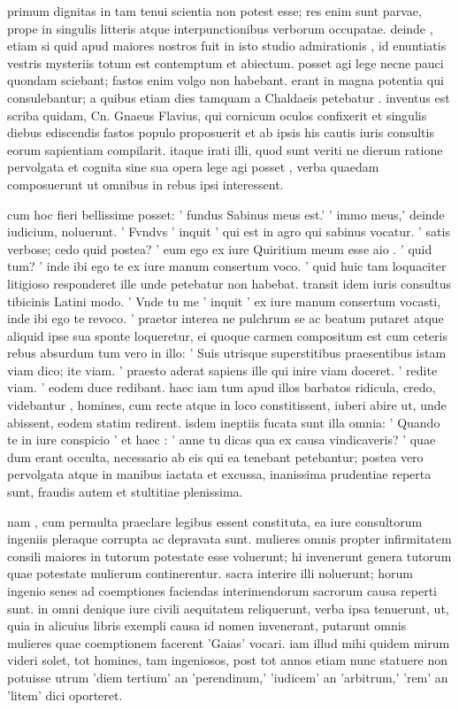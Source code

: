  primum dignitas in tam tenui scientia non potest esse; res enim sunt parvae, prope in singulis litteris atque interpunctionibus verborum occupatae. deinde , etiam si quid apud maiores nostros fuit in isto studio admirationis , id enuntiatis vestris mysteriis totum est contemptum et abiectum. posset agi lege necne pauci quondam sciebant; fastos enim volgo non habebant. erant in magna potentia qui consulebantur; a quibus etiam dies tamquam a Chaldaeis petebatur . inventus est scriba quidam, Cn. Gnaeus Flavius, qui cornicum oculos confixerit et singulis diebus ediscendis fastos populo proposuerit et ab ipsis his cautis iuris consultis eorum sapientiam compilarit. itaque irati illi, quod sunt veriti ne dierum ratione pervolgata et cognita sine sua opera lege agi posset , verba quaedam composuerunt ut omnibus in rebus ipsi interessent.

 cum hoc fieri bellissime posset: ' fundus Sabinus meus est.' ' immo meus,' deinde iudicium, noluerunt. ' Fvndvs ' inquit ' qui est in agro qui sabinus vocatur. ' satis verbose; cedo quid postea? ' eum ego ex iure Quiritium meum esse aio . ' quid tum? ' inde ibi ego te ex iure manum consertum voco. ' quid huic tam loquaciter litigioso responderet ille unde petebatur non habebat. transit idem iuris consultus tibicinis Latini modo. ' Vnde tu me ' inquit ' ex iure manum consertum vocasti, inde ibi ego te revoco. ' praetor interea ne pulchrum se ac beatum putaret atque aliquid ipse sua sponte loqueretur, ei quoque carmen compositum est cum ceteris rebus absurdum tum vero in illo: ' Suis utrisque superstitibus praesentibus istam viam dico; ite viam. ' praesto aderat sapiens ille qui inire viam doceret. ' redite viam. ' eodem duce redibant. haec iam tum apud illos barbatos ridicula, credo, videbantur , homines, cum recte atque in loco constitissent, iuberi abire ut, unde abissent, eodem statim redirent. isdem ineptiis fucata sunt illa omnia: ' Quando te in iure conspicio ' et haec : ' anne tu dicas qua ex causa vindicaveris? ' quae dum erant occulta, necessario ab eis qui ea tenebant petebantur; postea vero pervolgata atque in manibus iactata et excussa, inanissima prudentiae reperta sunt, fraudis autem et stultitiae plenissima.

 nam , cum permulta praeclare legibus essent constituta, ea iure consultorum ingeniis pleraque corrupta ac depravata sunt. mulieres omnis propter infirmitatem consili maiores in tutorum potestate esse voluerunt; hi invenerunt genera tutorum quae potestate mulierum continerentur. sacra interire illi noluerunt; horum ingenio senes ad coemptiones faciendas interimendorum sacrorum causa reperti sunt. in omni denique iure civili aequitatem reliquerunt, verba ipsa tenuerunt, ut, quia in alicuius libris exempli causa id nomen invenerant, putarunt omnis mulieres quae coemptionem facerent 'Gaias' vocari. iam illud mihi quidem mirum videri solet, tot homines, tam ingeniosos, post tot annos etiam nunc statuere non potuisse utrum 'diem tertium' an 'perendinum,' 'iudicem' an 'arbitrum,' 'rem' an 'litem' dici oporteret.

